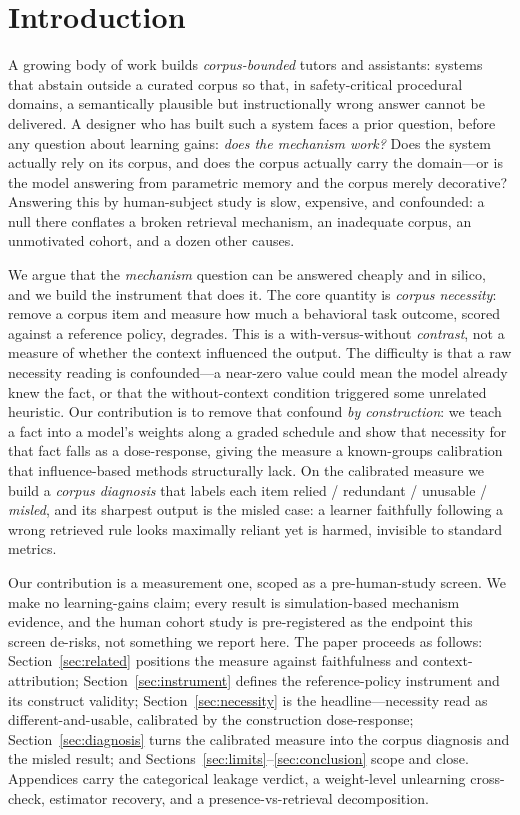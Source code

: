 \documentclass{article}
\begin{document}
\section{Introduction}
\label{sec:intro}
A growing body of work builds \emph{corpus-bounded} tutors and assistants: systems that abstain
outside a curated corpus so that, in safety-critical procedural domains, a semantically plausible but
instructionally wrong answer cannot be delivered. A designer who has built such a system faces a
prior question, before any question about learning gains: \emph{does the mechanism work?} Does the
system actually rely on its corpus, and does the corpus actually carry the domain---or is the model
answering from parametric memory and the corpus merely decorative? Answering this by human-subject
study is slow, expensive, and confounded: a null there conflates a broken retrieval mechanism, an
inadequate corpus, an unmotivated cohort, and a dozen other causes.

We argue that the \emph{mechanism} question can be answered cheaply and in silico, and we build the
instrument that does it. The core quantity is \emph{corpus necessity}: remove a corpus item and
measure how much a behavioral task outcome, scored against a reference policy, degrades. This is a
with-versus-without \emph{contrast}, not a measure of whether the context influenced the output. The
difficulty is that a raw necessity reading is confounded---a near-zero value could mean the model
already knew the fact, or that the without-context condition triggered some unrelated heuristic. Our
contribution is to remove that confound \emph{by construction}: we teach a fact into a model's weights
along a graded schedule and show that necessity for that fact falls as a dose-response, giving the
measure a known-groups calibration that influence-based methods structurally lack. On the calibrated
measure we build a \emph{corpus diagnosis} that labels each item relied / redundant / unusable /
\emph{misled}, and its sharpest output is the misled case: a learner faithfully following a wrong
retrieved rule looks maximally reliant yet is harmed, invisible to standard metrics.

Our contribution is a measurement one, scoped as a pre-human-study screen. We make no learning-gains
claim; every result is simulation-based mechanism evidence, and the human cohort study is
pre-registered as the endpoint this screen de-risks, not something we report here. The paper proceeds
as follows: Section~\ref{sec:related} positions the measure against faithfulness and
context-attribution; Section~\ref{sec:instrument} defines the reference-policy instrument and its
construct validity; Section~\ref{sec:necessity} is the headline---necessity read as
different-and-usable, calibrated by the construction dose-response; Section~\ref{sec:diagnosis} turns
the calibrated measure into the corpus diagnosis and the misled result; and
Sections~\ref{sec:limits}--\ref{sec:conclusion} scope and close. Appendices carry the categorical
leakage verdict, a weight-level unlearning cross-check, estimator recovery, and a presence-vs-retrieval
decomposition.
\end{document}
